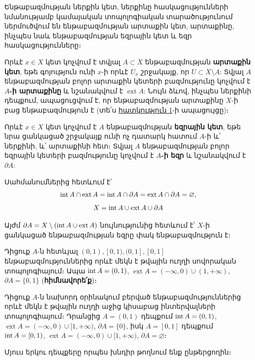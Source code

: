 \documentclass[./main.tex]{subfiles}
\DeclareMathOperator{\exter}{ext}
\begin{document}
Ենթաբազմության ներքին կետ, ներքինը հասկացությունների նմանությամբ \linebreak կամայական տոպոլոգիական տարածությունում ներմուծվում են ենթաբազմության արտաքին կետ, արտաքինը, ինչպես նաև ենթաբազմության եզրային կետ և եզր հասկացությունները։ 

Որևէ $x \in X$ կետ կոչվում է տվյալ $A \subset X$ ենթաբազմության \textbf{արտաքին կետ}, եթե գոյություն ունի $x$-ի որևէ $U_x$ շրջակայք, որ $U \subset X\setminus A$: Տվյալ $A$ ենթաբազմության բոլոր արտաքին կետերի բազմությունը կոչվում է \textbf{$A$-ի արտաքինը} և նշանակվում է $\exter A$: Նույն ձևով, ինչպես ներքինի դեպքում, ապացուցվում է, որ ենթաբազմության արտաքինը $X$-ի բաց ենթաբազմություն է (տե՛ս \hyperref[հատկություն 1]{հատկություն 1}-ի ապացույցը)։

Որևէ $x\in X$ կետ կոչվում է $A$ ենթաբազմության \textbf{եզրային կետ}, եթե նրա ցան\-կացած շրջակայք ունի ոչ դատարկ հատում $A$-ի և՛ ներքինի, և՛ արտաքինի հետ։ Տվյալ $A$ ենթաբազմության բոլոր եզրային կետերի բազմությունը կոչվում է \textbf{$A$-ի եզր} և նշանակվում է $\partial A$:

Սահմանումներից հետևում է՝ 
\[
\inter A \cap \exter A = \inter A \cap \partial A = \exter A \cap \partial A = \varnothing,
\]
\[
X = \inter A \cup \exter A \cup \partial A
\]

Այժմ $\partial A = X \setminus ({\inter A}  \cup {\exter A})$ նույնությունից հետևում է՝ $X$-ի ցանկացած ենթա\-բազմության եզրը փակ ենթաբազմություն է։
\begin{example} \label{Օրինակ 1։}
Դիցուք $A$-ն հետևյալ $(0,1),[0,1), (0,1], [0,1]$ ենթաբազմություններից որևէ մեկն է թվային ուղղի սովորական տոպոլոգիայում։ Ապա $ \operatorname{int} A = (0, 1)$, $\exter A = (-\infty, 0) \cup (1, +\infty)$, $ \partial A = \{0, 1\}$ (\textbf{հիմնավորե՛ք})։
\end{example}


\begin{example} \label{Օրինակ 2։}
Դիցուք $A$-ն նախորդ օրինակում բերված ենթաբազմություններից որևէ մեկն է թվային ուղղի աջից կիսաբաց ինտերվալների տոպոլոգիայում։ Դրան\-ցից $A = (0,1)$ դեպքում $\operatorname{int} A = (0,1)$, $\exter A = (-\infty,0) \cup [1,+\infty)$, $ \partial A = \{0\}$, իսկ $A=[0,1]$ դեպքում  $\operatorname{int} A = [0,1)$, $\exter A = (-\infty,0) \cup [1,+\infty)$, $\partial A = \varnothing $։

Մյուս երկու դեպքերը որպես խնդիր թողնում ենք ընթերցողին։
\end{example}
\end{document}
